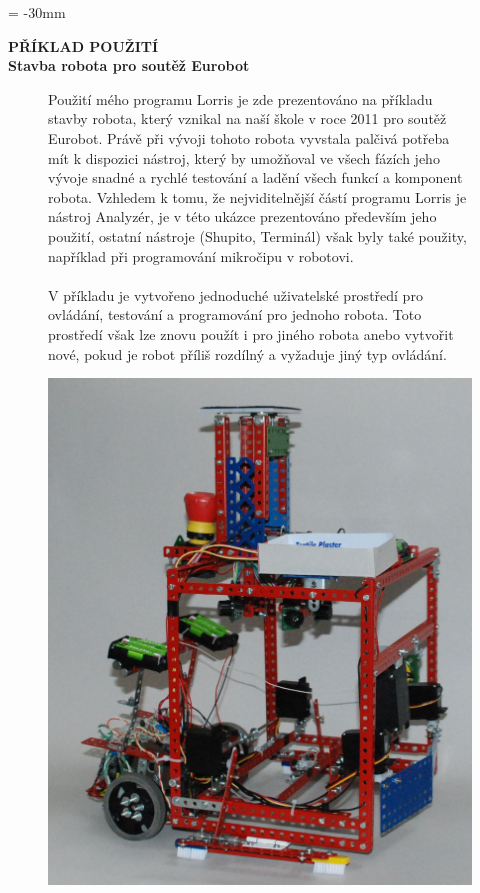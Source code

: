 \documentclass[17pt]{extreport}
\newcommand{\B}{\textbf} %
\begin{document}
\newpage
\voffset = -30mm %
\begin{center}
    \Large \B{PŘÍKLAD POUŽITÍ \\ Stavba robota pro soutěž Eurobot}
\end{center}
\vspace{5mm}
\enlargethispage{200mm} %
\begin{figure}[ht]
    \begin{minipage}[t]{0.48\linewidth}
Použití mého programu Lorris je zde prezentováno na příkladu stavby robota, který vznikal na naší škole v roce 2011 pro soutěž Eurobot. Právě při vývoji tohoto robota vyvstala palčivá potřeba mít k dispozici nástroj, který by umožňoval ve všech fázích jeho vývoje snadné a rychlé testování a ladění všech funkcí a komponent robota. Vzhledem k tomu, že nejviditelnější částí programu Lorris je nástroj Analyzér, je v této ukázce prezentováno především jeho použití, ostatní nástroje (Shupito, Terminál) však byly také použity, například při programování mikročipu v robotovi.
\\ \\
V příkladu je vytvořeno jednoduché uživatelské prostředí pro ovládání, testování a programování pro jednoho robota. Toto prostředí však lze znovu použít i pro jiného robota anebo vytvořit nové, pokud je robot příliš rozdílný a vyžaduje jiný typ ovládání.
    \end{minipage}
    \hfill
    \begin{minipage}[t]{0.50\linewidth}
        \vspace{0pt}
        \includegraphics[width=\linewidth]{img/robot.jpg}
    \end{minipage}
\end{figure}\\
\end{document}
